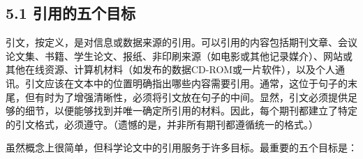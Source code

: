 \subsection*{5.1 引用的五个目标}
引文，按定义，是对信息或数据来源的引用。可以引用的内容包括期刊文章、会议论文集、书籍、学生论文、报纸、非印刷来源（如电影或其他记录媒介）、网站或其他在线资源、计算机材料（如发布的数据CD-ROM或一片软件），以及个人通讯。引文应该在文本中的位置明确指出哪些内容需要引用。通常，这位于句子的末尾，但有时为了增强清晰性，必须将引文放在句子的中间。显然，引文必须提供足够的细节，以便能够找到并唯一确定所引用的材料。因此，每个期刊都建立了特定的引文格式，必须遵守。（遗憾的是，并非所有期刊都遵循统一的格式。）

虽然概念上很简单，但科学论文中的引用服务于许多目标。最重要的五个目标是：

